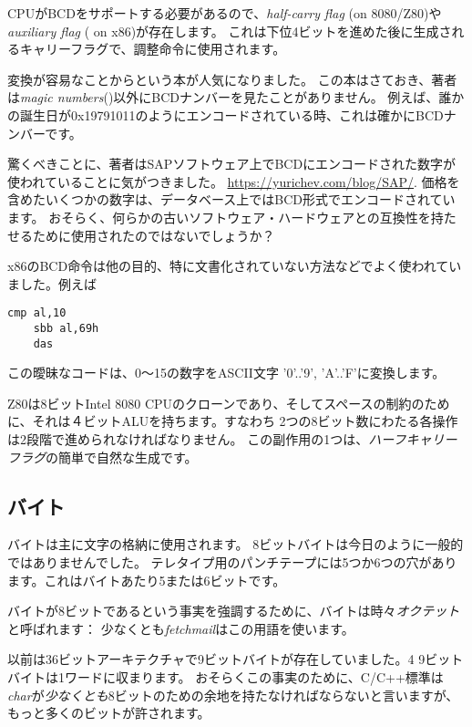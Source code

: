 CPUが\ac{BCD}をサポートする必要があるので、\emph{half-carry flag} (on 8080/Z80)や
\emph{auxiliary flag} ( on x86)が存在します。
これは下位4ビットを進めた後に生成されるキャリーフラグで、調整命令に使用されます。

変換が容易なことからという本が人気になりました。
この本はさておき、著者は\emph{magic numbers}()以外に\ac{BCD}ナンバーを見たことがありません。
例えば、誰かの誕生日が0x19791011のようにエンコードされている時、これは確かに\ac{BCD}ナンバーです。

驚くべきことに、著者はSAPソフトウェア上で\ac{BCD}にエンコードされた数字が使われていることに気がつきました。 \url{https://yurichev.com/blog/SAP/}.
価格を含めたいくつかの数字は、データベース上ではBCD形式でエンコードされています。
おそらく、何らかの古いソフトウェア・ハードウェアとの互換性を持たせるために使用されたのではないでしょうか？

x86の\ac{BCD}命令は他の目的、特に文書化されていない方法などでよく使われていました。例えば

\begin{lstlisting}[style=customasmx86]
	cmp al,10
	sbb al,69h
	das
\end{lstlisting}
この曖昧なコードは、0～15の数字を\ac{ASCII}文字 '0'..'9', 'A'..'F'に変換します。


Z80は8ビットIntel 8080 CPUのクローンであり、そしてスペースの制約のために、それは４ビット\ac{ALU}を持ちます。すなわち
2つの8ビット数にわたる各操作は2段階で進められなければなりません。
この副作用の1つは、\emph{ハーフキャリーフラグ}の簡単で自然な生成です。

\subsection{バイト}

バイトは主に文字の格納に使用されます。 
8ビットバイトは今日のように一般的ではありませんでした。
テレタイプ用のパンチテープには5つか6つの穴があります。これはバイトあたり5または6ビットです。

バイトが8ビットであるという事実を強調するために、バイトは時々\emph{オクテット}と呼ばれます：
少なくとも\emph{fetchmail}はこの用語を使います。

以前は36ビットアーキテクチャで9ビットバイトが存在していました。4 9ビットバイトは1ワードに収まります。
おそらくこの事実のために、C/C++標準は\emph{char}が\emph{少なくとも}8ビットのための余地を持たなければならないと言いますが、
もっと多くのビットが許されます。

